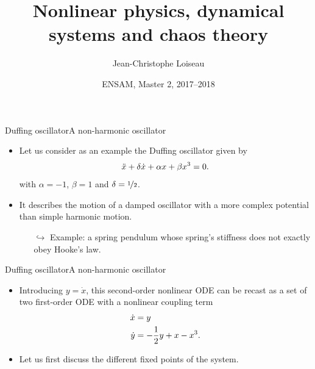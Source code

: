 \documentclass[usenames,dvipsnames,svgnames,10pt,aspectratio=169]{beamer}
\title[Nonlinear Physics] %
{
	Nonlinear physics, dynamical \\ systems and chaos theory
}
\author[J.-Ch.~Loiseau] %
{
	Jean-Christophe Loiseau
}
\institute[unused]
{
	\url{jean-christophe.loiseau@ensam.eu} \\
	DynFluid, \\
	Arts et M\'etiers ParisTech, France
}
\date[unused]{ENSAM, Master 2, 2017--2018}
\begin{document}
\titleframe %


%
%
%
%

\begin{frame}[t, c]{Duffing oscillator}{A non-harmonic oscillator}
	\begin{itemize}
		\item Let us consider as an example the Duffing oscillator given by
		\begin{equation}
			\ddot{x} + \displaystyle \delta \dot{x} +  \alpha x  + \beta  x^3 = 0.
			\notag
		\end{equation}
		with $\alpha = -1$, $\beta = 1$ and $\delta = \nicefrac{1}{2}$.
		\bigskip

		\item It describes the motion of a damped oscillator with a more complex potential than simple harmonic motion.
		\begin{itemize}
			\item[$\hookrightarrow$] Example: a spring pendulum whose spring's stiffness does not exactly obey Hooke's law.
		\end{itemize}
	\end{itemize}

	\vspace{1cm}
\end{frame}

\begin{frame}[t, c]{Duffing oscillator}{A non-harmonic oscillator}
	\begin{itemize}
		\item Introducing $y = \dot{x}$, this second-order nonlinear ODE can be recast as a set of two first-order ODE with a nonlinear coupling term
		\begin{equation}
			\begin{aligned}
				\dot{x} & = y \\
				\dot{y} & = -\displaystyle \frac{1}{2} y +  x -  x^3.
			\end{aligned}
			\notag
		\end{equation}

		\bigskip

		\item Let us first discuss the different fixed points of the system.
	\end{itemize}

	\vspace{1cm}
\end{frame}
\end{document}
